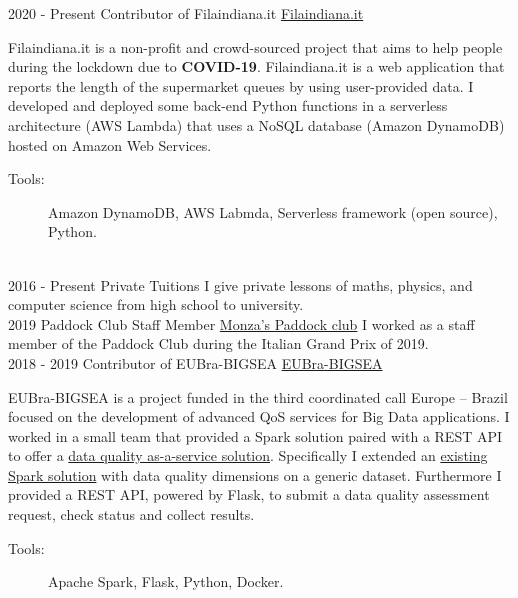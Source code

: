 \documentclass[letterpaper]{twentysecondcv} %
\begin{document}
\begin{twenty} %
	\twentyitem
	{2020 -}
	{Present}
	{Contributor of Filaindiana.it}
	{\href{https://www.filaindiana.it}{Filaindiana.it}}
	{}
	{Filaindiana.it is a non-profit and crowd-sourced project that aims to help people during the lockdown due to \textbf{COVID-19}. Filaindiana.it is a web application that reports the length of the supermarket queues by using user-provided data. I developed and deployed some back-end Python functions in a serverless architecture (AWS Lambda) that uses a NoSQL database (Amazon DynamoDB) hosted on Amazon Web Services.
		\begin{description}
			\item[Tools:] Amazon DynamoDB, AWS Labmda, Serverless framework (open source), Python.
		\end{description}}
	\\
	\twentyitem
	{2016 -}
	{Present}
	{Private Tuitions}
	{}
	{}
	{I give private lessons of maths, physics, and computer science from high school to university.}
	\\
	\twentyitem
	{2019}
	{}
	{Paddock Club Staff Member}
	{\href{https://tickets.formula1.com/it/h-formula1-hospitality}{Monza's Paddock club}}
	{}
	{I worked as a staff member of the Paddock Club during the Italian Grand Prix of 2019.}
	\\
	\twentyitem
	{2018 -}
	{2019}
	{Contributor of EUBra-BIGSEA}
	{\href{https://www.eubra-bigsea.eu}{EUBra-BIGSEA}}
	{}
	{EUBra-BIGSEA is a project funded in the third coordinated call Europe – Brazil focused on the development of advanced QoS services for Big Data applications. I worked in a small team that provided a Spark solution paired with a REST API to offer a \href{https://www.eubra-bigsea.eu/node/301}{data quality as-a-service solution}. Specifically I extended an \href{https://www.politesi.polimi.it/handle/10589/134468}{existing Spark solution} with data quality dimensions on a generic dataset. Furthermore I provided a REST API, powered by Flask, to submit a data quality assessment request, check status and collect results.
		\begin{description}
			\item[Tools:] Apache Spark, Flask, Python, Docker.
		\end{description}}
\end{twenty}
\end{document}
